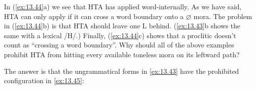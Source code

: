 \documentclass[output=paper]{langsci/langscibook}
\begin{document}
        \vspace{.5\baselineskip}
    \z
\z
In (\ref{ex:13.44}a) we see that \gls{HTA} has applied word-internally. As
we have said, \gls{HTA} can only apply if it can cross a word boundary onto a $\varnothing$
mora. The problem in (\ref{ex:13.44}b) is that \gls{HTA} should leave one L
behind. (\ref{ex:13.43}b shows the same with a lexical /H/.) Finally,
(\ref{ex:13.44}c) shows that a proclitic doesn’t count as “crossing a word
boundary”. Why should all of the above examples prohibit \gls{HTA} from hitting
every available toneless mora on its leftward path?

The answer is that the ungrammatical forms in \eqref{ex:13.43} have the
prohibited configuration in \eqref{ex:13.45}:\largerpage
\end{document}
